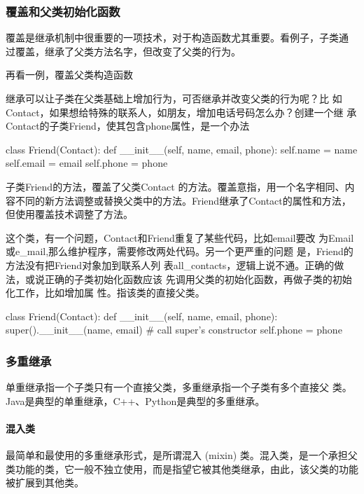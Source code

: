 

\subsubsection{覆盖和父类初始化函数}
覆盖是继承机制中很重要的一项技术，对于构造函数尤其重要。看例子，子类通
过覆盖，继承了父类方法名字，但改变了父类的行为。

再看一例，覆盖父类构造函数

继承可以让子类在父类基础上增加行为，可否继承并改变父类的行为呢？比
如Contact，如果想给特殊的联系人，如朋友，增加电话号码怎么办？创建一个继
承Contact的子类Friend，使其包含phone属性，是一个办法

\begin{python}
class Friend(Contact):
    def __init__(self, name, email, phone):
        self.name = name
        self.email = email
        self.phone = phone
\end{python}

子类Friend的方法，覆盖了父类Contact
的方法。覆盖意指，用一个名字相同、内容不同的新方法调整或替换父类中的方法。Friend继承了Contact的属性和方法，但使用覆盖技术调整了方法。

这个类，有一个问题，Contact和Friend重复了某些代码，比如email要改
为Email或e\_mail,那么维护程序，需要修改两处代码。另一个更严重的问题
是，Friend的方法没有把Friend对象加到联系人列
表all\_contacts，逻辑上说不通。正确的做法，或说正确的子类初始化函数应该
先调用父类的初始化函数，再做子类的初始化工作，比如增加属
性。指该类的直接父类。
\begin{python}
class Friend(Contact):
    def __init__(self, name, email, phone):
        super().__init__(name, email)  # call super's constructor
        self.phone = phone
\end{python}

\subsubsection{多重继承}
单重继承指一个子类只有一个直接父类，多重继承指一个子类有多个直接父
类。Java是典型的单重继承，C++、Python是典型的多重继承。
\paragraph{混入类}
最简单和最使用的多重继承形式，是所谓混入 (mixin) 类。混入类，是一个承担父类功能的类，它一般不独立使用，而是指望它被其他类继承，由此，该父类的功能被扩展到其他类。

